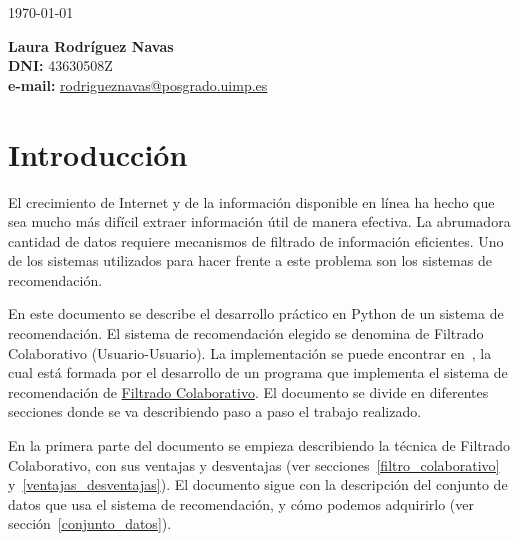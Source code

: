 \documentclass{uimppracticas}
\begin{document}
	
\frontmatter


\begin{center}
	\large \today
\end{center}

\vspace{40mm}

\begin{flushright}
	{\bf Laura Rodríguez Navas}\\
	\textbf{DNI:} 43630508Z\\
	\textbf{e-mail:} \href{rodrigueznavas@posgrado.uimp.es}{rodrigueznavas@posgrado.uimp.es}
\end{flushright}

\newpage

\tableofcontents

\newpage

\mainmatter

\setlength\parskip{2.5ex}

\section{Introducción}\label{introducción}

El crecimiento de Internet y de la información disponible en línea ha hecho que sea mucho más difícil extraer información útil de manera efectiva. La abrumadora cantidad de datos requiere mecanismos de filtrado de información eficientes. Uno de los sistemas utilizados para hacer frente a este problema son los sistemas de recomendación.

En este documento se describe el desarrollo práctico en Python de un sistema de recomendación. El sistema de recomendación elegido se denomina de Filtrado Colaborativo (Usuario-Usuario). La implementación se puede encontrar en~\cite{GitHubRepo}, la cual está formada por el desarrollo de un programa que implementa el sistema de recomendación de \href{https://es.wikipedia.org/wiki/Filtrado_colaborativo}{Filtrado Colaborativo}. El documento se divide en diferentes secciones donde se va describiendo paso a paso el trabajo realizado. 

En la primera parte del documento se empieza describiendo la técnica de Filtrado Colaborativo, con sus ventajas y desventajas (ver secciones~\ref{filtro_colaborativo} y~\ref{ventajas_desventajas}). El documento sigue con la descripción del conjunto de datos que usa el sistema de recomendación, y cómo podemos adquirirlo (ver sección~\ref{conjunto_datos}).
\end{document}
